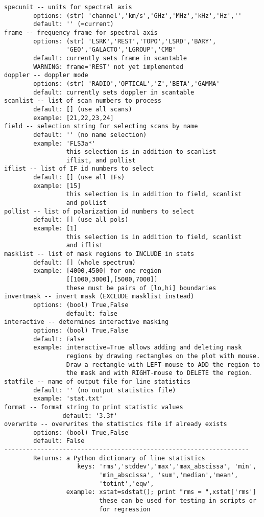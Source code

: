 \begin{verbatim}
specunit -- units for spectral axis
        options: (str) 'channel','km/s','GHz','MHz','kHz','Hz',''
        default: '' (=current)
frame -- frequency frame for spectral axis
        options: (str) 'LSRK','REST','TOPO','LSRD','BARY',
                 'GEO','GALACTO','LGROUP','CMB'
        default: currently sets frame in scantable
        WARNING: frame='REST' not yet implemented
doppler -- doppler mode
        options: (str) 'RADIO','OPTICAL','Z','BETA','GAMMA'
        default: currently sets doppler in scantable
scanlist -- list of scan numbers to process
        default: [] (use all scans)
        example: [21,22,23,24]
field -- selection string for selecting scans by name
        default: '' (no name selection)
        example: 'FLS3a*'
                 this selection is in addition to scanlist
                 iflist, and pollist
iflist -- list of IF id numbers to select
        default: [] (use all IFs)
        example: [15]
                 this selection is in addition to field, scanlist
                 and pollist
pollist -- list of polarization id numbers to select
        default: [] (use all pols)
        example: [1]
                 this selection is in addition to field, scanlist
                 and iflist
masklist -- list of mask regions to INCLUDE in stats
        default: [] (whole spectrum)
        example: [4000,4500] for one region
                 [[1000,3000],[5000,7000]]
                 these must be pairs of [lo,hi] boundaries
invertmask -- invert mask (EXCLUDE masklist instead)
        options: (bool) True,False
                 default: false
interactive -- determines interactive masking
        options: (bool) True,False
        default: False
        example: interactive=True allows adding and deleting mask 
                 regions by drawing rectangles on the plot with mouse. 
                 Draw a rectangle with LEFT-mouse to ADD the region to 
                 the mask and with RIGHT-mouse to DELETE the region. 
statfile -- name of output file for line statistics
        default: '' (no output statistics file)
        example: 'stat.txt'
format -- format string to print statistic values
                default: '3.3f'
overwrite -- overwrites the statistics file if already exists 
        options: (bool) True,False
        default: False
-------------------------------------------------------------------
        Returns: a Python dictionary of line statistics
                    keys: 'rms','stddev','max','max_abscissa', 'min',
                          'min_abscissa', 'sum','median','mean',
                          'totint','eqw', 
                 example: xstat=sdstat(); print "rms = ",xstat['rms']
                          these can be used for testing in scripts or
                          for regression
                          

\end{verbatim}
